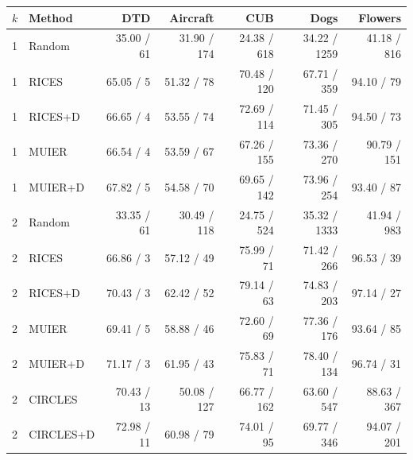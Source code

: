 \begin{tabular}{llrrrrr}
\toprule
$k$ & Method & DTD & Aircraft & CUB & Dogs & Flowers \\
\midrule
1 & Random & 35.00 / 61 & 31.90 / 174 & 24.38 / 618 & 34.22 / 1259 & 41.18 / 816 \\
1 & RICES & 65.05 / 5 & 51.32 / 78 & 70.48 / 120 & 67.71 / 359 & 94.10 / 79 \\
1 & RICES+D & 66.65 / 4 & 53.55 / 74 & 72.69 / 114 & 71.45 / 305 & 94.50 / 73 \\
1 & MUIER & 66.54 / 4 & 53.59 / 67 & 67.26 / 155 & 73.36 / 270 & 90.79 / 151 \\
1 & MUIER+D & 67.82 / 5 & 54.58 / 70 & 69.65 / 142 & 73.96 / 254 & 93.40 / 87 \\
2 & Random & 33.35 / 61 & 30.49 / 118 & 24.75 / 524 & 35.32 / 1333 & 41.94 / 983 \\
2 & RICES & 66.86 / 3 & 57.12 / 49 & 75.99 / 71 & 71.42 / 266 & 96.53 / 39 \\
2 & RICES+D & 70.43 / 3 & 62.42 / 52 & 79.14 / 63 & 74.83 / 203 & 97.14 / 27 \\
2 & MUIER & 69.41 / 5 & 58.88 / 46 & 72.60 / 69 & 77.36 / 176 & 93.64 / 85 \\
2 & MUIER+D & 71.17 / 3 & 61.95 / 43 & 75.83 / 71 & 78.40 / 134 & 96.74 / 31 \\
2 & CIRCLES & 70.43 / 13 & 50.08 / 127 & 66.77 / 162 & 63.60 / 547 & 88.63 / 367 \\
2 & CIRCLES+D & 72.98 / 11 & 60.98 / 79 & 74.01 / 95 & 69.77 / 346 & 94.07 / 201 \\
\bottomrule
\end{tabular}
